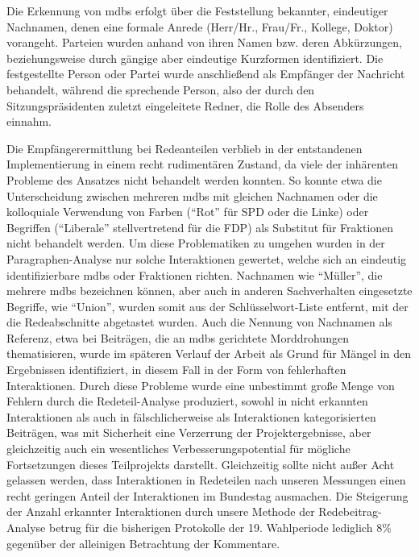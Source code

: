 Die Erkennung von \glspl{mdb} erfolgt über die Feststellung bekannter, eindeutiger
Nachnamen, denen eine formale Anrede (Herr/Hr., Frau/Fr., Kollege, Doktor)
vorangeht. Parteien wurden anhand von ihren Namen bzw. deren Abkürzungen,
beziehungsweise durch gängige aber eindeutige Kurzformen identifiziert. Die
festgestellte Person oder Partei wurde anschließend als Empfänger der Nachricht
behandelt, während die sprechende Person, also der durch den
Sitzungspräsidenten zuletzt eingeleitete Redner, die Rolle des Absenders
einnahm.

Die Empfängerermittlung bei Redeanteilen verblieb in der entstandenen
Implementierung in einem recht rudimentären Zustand, da viele der inhärenten
Probleme des Ansatzes nicht behandelt werden konnten. So konnte etwa die
Unterscheidung zwischen mehreren \glspl{mdb} mit gleichen Nachnamen oder die
kolloquiale Verwendung von Farben (\enquote{Rot} für SPD oder die Linke) oder
Begriffen (\enquote{Liberale} stellvertretend für die FDP) als Substitut für Fraktionen
nicht behandelt werden. Um diese Problematiken zu umgehen wurden in der
Paragraphen-Analyse nur solche Interaktionen gewertet, welche sich an eindeutig
identifizierbare \glspl{mdb} oder Fraktionen richten. Nachnamen wie \enquote{Müller}, die
mehrere \glspl{mdb} bezeichnen können, aber auch in anderen Sachverhalten eingesetzte
Begriffe, wie \enquote{Union}, wurden somit aus der Schlüsselwort-Liste entfernt, mit
der die Redeabschnitte abgetastet wurden.  Auch die Nennung von Nachnamen als Referenz, etwa
bei Beiträgen, die an \glspl{mdb} gerichtete Morddrohungen thematisieren,
wurde im späteren Verlauf der Arbeit als Grund für Mängel in den Ergebnissen
identifiziert, in diesem Fall in der Form von fehlerhaften Interaktionen.
Durch diese Probleme wurde eine unbestimmt große Menge von Fehlern durch die
Redeteil-Analyse produziert, sowohl in nicht erkannten Interaktionen als auch in
fälschlicherweise als Interaktionen kategorisierten Beiträgen, was mit Sicherheit
eine Verzerrung der Projektergebnisse, aber gleichzeitig auch ein wesentliches
Verbesserungspotential für mögliche Fortsetzungen dieses Teilprojekts
darstellt. Gleichzeitig sollte nicht außer Acht gelassen werden, dass
Interaktionen in Redeteilen nach unseren Messungen einen recht geringen Anteil
der Interaktionen im Bundestag ausmachen. Die Steigerung der Anzahl erkannter
Interaktionen durch unsere Methode der Redebeitrag-Analyse betrug für die
bisherigen Protokolle der 19. Wahlperiode lediglich 8\% gegenüber der alleinigen
Betrachtung der Kommentare.

